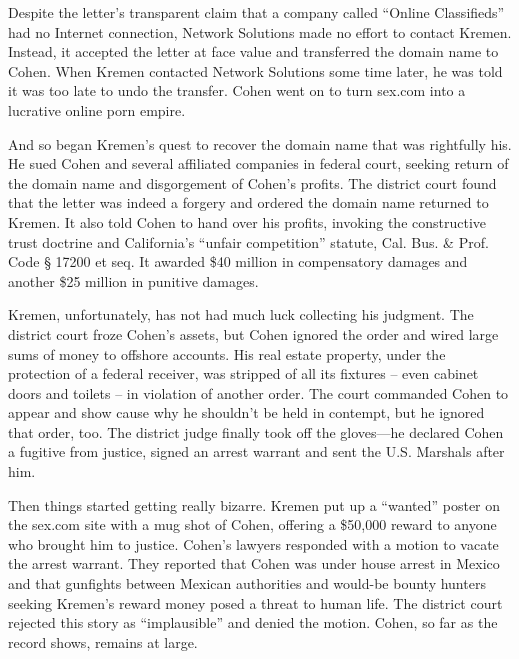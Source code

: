 Despite the letter's transparent claim that a company called ``Online
Classifieds'' had no Internet connection, Network Solutions made no effort to
contact Kremen. Instead, it accepted the letter at face value and transferred
the domain name to Cohen. When Kremen contacted Network Solutions some time
later, he was told it was too late to undo the transfer. Cohen went on to turn
sex.com into a lucrative online porn empire.

And so began Kremen's quest to recover the domain name that was rightfully his.
He sued Cohen and several affiliated companies in federal court, seeking return
of the domain name and disgorgement of Cohen's profits. The district court
found that the letter was indeed a forgery and ordered the domain name returned
to Kremen. It also told Cohen to hand over his profits, invoking the
constructive trust doctrine and California's ``unfair competition'' statute,
Cal. Bus. \& Prof. Code {\S} 17200 et seq. It awarded \$40 million in
compensatory damages and another \$25 million in punitive damages.

Kremen, unfortunately, has not had much luck collecting his judgment. The
district court froze Cohen's assets, but Cohen ignored the order and wired
large sums of money to offshore accounts. His real estate property, under the
protection of a federal receiver, was stripped of all its fixtures -- even
cabinet doors and toilets -- in violation of another order. The court commanded
Cohen to appear and show cause why he shouldn't be held in contempt, but he
ignored that order, too. The district judge finally took off the gloves---he
declared Cohen a fugitive from justice, signed an arrest warrant and sent
the U.S. Marshals after him.

Then things started getting really bizarre. Kremen put up a ``wanted'' poster on
the sex.com site with a mug shot of Cohen, offering a \$50,000 reward to anyone
who brought him to justice. Cohen's lawyers responded with a motion to vacate
the arrest warrant. They reported that Cohen was under house arrest in Mexico
and that gunfights between Mexican authorities and would-be bounty hunters
seeking Kremen's reward money posed a threat to human life. The district court
rejected this story as ``implausible'' and denied the motion. Cohen, so far as
the record shows, remains at large.

